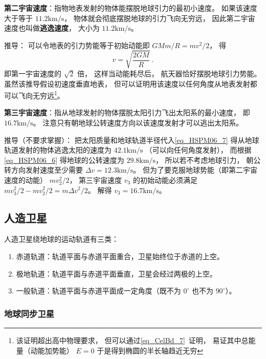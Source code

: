 \textbf{第二宇宙速度}：指物地表发射的物体能摆脱地球引力的最初小速度。 如果该速度大于等于 $11.2\mathrm{km/s}$， 物体就会彻底摆脱地球的引力飞向无穷远， 因此第二宇宙速度也叫做\textbf{逃逸速度}， 大小为 $11.2\mathrm{km/s}$。

推导： 可以令地表的引力势能等于初始动能即 $GMm/R = mv^2/2$， 得
\begin{equation}\label{eq_HSPM06_7}
v = \sqrt{\frac{2GM}{R}}~.
\end{equation}
即第一宇宙速度的 $\sqrt{2}$ 倍， 这样当动能耗尽后， 航天器恰好摆脱地球引力势能。 虽然该推导假设初速度垂直地表， 但可以证明用该速度以任何角度从地表发射都可以飞向无穷远\footnote{该证明超出高中物理要求， 但可以通过\autoref{eq_CelBd_7}~证明， 易证其中总能量（动能加势能） $E = 0$ 于是得到椭圆的半长轴趋近无穷}。

\textbf{第三宇宙速度}：指从地球发射的物体摆脱太阳引力飞出太阳系的最小速度， 即 $16.7\mathrm{km/s}$。 注意只有朝地球公转速度方向以该速度发射才可以逃出太阳系。

推导（不要求掌握）： 把太阳质量和地球轨道半径代入\autoref{eq_HSPM06_7} 得从地球轨道发射的物体逃逸太阳的速度为 $42.1\mathrm{km/s}$ （可以向任何角度发射）， 而根据\autoref{eq_HSPM06_6} 得地球的公转速度为 $29.8\mathrm{km/s}$， 所以若不考虑地球引力， 朝公转方向发射速度至少需要 $\Delta v = 12.3\mathrm{km/s}$。 但为了要克服地球势能（即第二宇宙速度的动能） $mv_2^2/2$， 第三宇宙速度 $v_3$ 的初始动能必须满足 $mv_3^2/2 - mv_2^2/2 = m\Delta v^2/2$。 解得 $v_3 = 16.7\mathrm{km/s}$。

\subsection{人造卫星}

人造卫星绕地球的运动轨道有三类：

\begin{enumerate}
\item 赤道轨道：轨道平面与赤道平面重合，卫星始终位于赤道的上空。
\item 极地轨道：轨道平面与赤道平面垂直，卫星会经过两极的上空。
\item 一般轨道：轨道平面与赤道平面成一定角度（既不为 $0^\circ$ 也不为 $90^\circ$）。
\end{enumerate}

\subsubsection{地球同步卫星}



